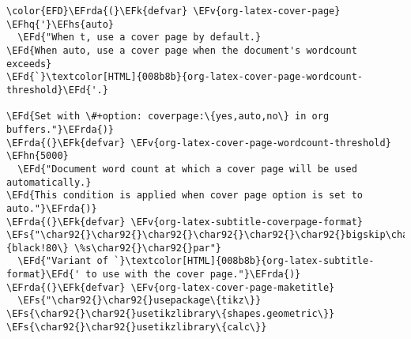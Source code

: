 \documentclass{article}
\newcommand{\EFs}[1]{\textcolor{EFs}{#1}} %
\newcommand{\EFd}[1]{\textcolor{EFd}{#1}} %
\newcommand{\EFk}[1]{\textcolor{EFk}{#1}} %
\newcommand{\EFv}[1]{\textcolor{EFv}{#1}} %
\newcommand{\EFhn}[1]{\textcolor{EFhn}{\textbf{#1}}} %
\newcommand{\EFhq}[1]{#1} %
\newcommand{\EFhs}[1]{\textcolor{EFhs}{#1}} %
\newcommand{\EFrda}[1]{\textcolor{EFrda}{#1}} %
\begin{document}
\begin{Code}
\begin{Verbatim}
\color{EFD}\EFrda{(}\EFk{defvar} \EFv{org-latex-cover-page} \EFhq{'}\EFhs{auto}
  \EFd{"When t, use a cover page by default.}
\EFd{When auto, use a cover page when the document's wordcount exceeds}
\EFd{`}\textcolor[HTML]{008b8b}{org-latex-cover-page-wordcount-threshold}\EFd{'.}

\EFd{Set with \#+option: coverpage:\{yes,auto,no\} in org buffers."}\EFrda{)}
\EFrda{(}\EFk{defvar} \EFv{org-latex-cover-page-wordcount-threshold} \EFhn{5000}
  \EFd{"Document word count at which a cover page will be used automatically.}
\EFd{This condition is applied when cover page option is set to auto."}\EFrda{)}
\EFrda{(}\EFk{defvar} \EFv{org-latex-subtitle-coverpage-format} \EFs{"\char92{}\char92{}\char92{}\char92{}\char92{}\char92{}bigskip\char92{}n\char92{}\char92{}LARGE\char92{}\char92{}mdseries\char92{}\char92{}itshape\char92{}\char92{}color\{black!80\} \%s\char92{}\char92{}par"}
  \EFd{"Variant of `}\textcolor[HTML]{008b8b}{org-latex-subtitle-format}\EFd{' to use with the cover page."}\EFrda{)}
\EFrda{(}\EFk{defvar} \EFv{org-latex-cover-page-maketitle}
  \EFs{"\char92{}\char92{}usepackage\{tikz\}}
\EFs{\char92{}\char92{}usetikzlibrary\{shapes.geometric\}}
\EFs{\char92{}\char92{}usetikzlibrary\{calc\}}


\end{Verbatim}
\end{Code}
\end{document}
